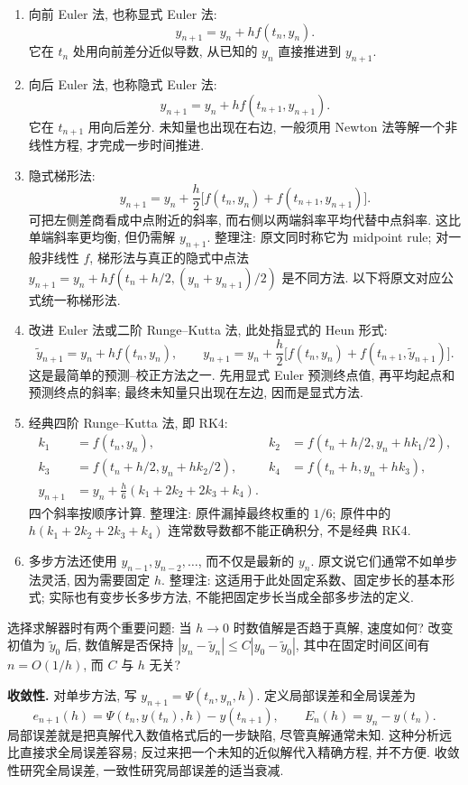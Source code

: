 \begin{enumerate}
\item 向前 Euler 法, 也称显式 Euler 法:
\[
y_{n+1}=y_n+hf(t_n,y_n).
\]
它在 $t_n$ 处用向前差分近似导数, 从已知的 $y_n$ 直接推进到 $y_{n+1}$.
\item 向后 Euler 法, 也称隐式 Euler 法:
\[
y_{n+1}=y_n+hf(t_{n+1},y_{n+1}).
\]
它在 $t_{n+1}$ 用向后差分. 未知量也出现在右边, 一般须用 Newton 法等解一个非线性方程, 才完成一步时间推进.
\item 隐式梯形法:
\[
y_{n+1}=y_n+\frac h2\bigl[f(t_n,y_n)+f(t_{n+1},y_{n+1})\bigr].
\]
可把左侧差商看成中点附近的斜率, 而右侧以两端斜率平均代替中点斜率. 这比单端斜率更均衡, 但仍需解 $y_{n+1}$. 整理注: 原文同时称它为 midpoint rule; 对一般非线性 $f$, 梯形法与真正的隐式中点法 $y_{n+1}=y_n+hf(t_n+h/2,(y_n+y_{n+1})/2)$ 是不同方法. 以下将原文对应公式统一称梯形法.
\item 改进 Euler 法或二阶 Runge--Kutta 法, 此处指显式的 Heun 形式:
\[
\widetilde y_{n+1}=y_n+hf(t_n,y_n),\qquad
y_{n+1}=y_n+\frac h2\bigl[f(t_n,y_n)+f(t_{n+1},\widetilde y_{n+1})\bigr].
\]
这是最简单的预测--校正方法之一. 先用显式 Euler 预测终点值, 再平均起点和预测终点的斜率; 最终未知量只出现在左边, 因而是显式方法.
\item 经典四阶 Runge--Kutta 法, 即 RK4:
\begin{align*}
k_1&=f(t_n,y_n),&k_2&=f(t_n+h/2,y_n+hk_1/2),\\
k_3&=f(t_n+h/2,y_n+hk_2/2),&k_4&=f(t_n+h,y_n+hk_3),\\
y_{n+1}&=y_n+\frac h6(k_1+2k_2+2k_3+k_4).
\end{align*}
四个斜率按顺序计算. 整理注: 原件漏掉最终权重的 $1/6$; 原件中的 $h(k_1+2k_2+2k_3+k_4)$ 连常数导数都不能正确积分, 不是经典 RK4.
\item 多步方法还使用 $y_{n-1},y_{n-2},\ldots$, 而不仅是最新的 $y_n$. 原文说它们通常不如单步法灵活, 因为需要固定 $h$. 整理注: 这适用于此处固定系数、固定步长的基本形式; 实际也有变步长多步方法, 不能把固定步长当成全部多步法的定义.
\end{enumerate}

选择求解器时有两个重要问题: 当 $h\to0$ 时数值解是否趋于真解, 速度如何? 改变初值为 $\widetilde y_0$ 后, 数值解是否保持 $|y_n-\widetilde y_n|\leq C|y_0-\widetilde y_0|$, 其中在固定时间区间有 $n=O(1/h)$, 而 $C$ 与 $h$ 无关?

\textbf{收敛性.} 对单步方法, 写 $y_{n+1}=\Psi(t_n,y_n,h)$. 定义局部误差和全局误差为
\[
e_{n+1}(h)=\Psi(t_n,y(t_n),h)-y(t_{n+1}),\qquad
E_n(h)=y_n-y(t_n).
\]
局部误差就是把真解代入数值格式后的一步缺陷, 尽管真解通常未知. 这种分析远比直接求全局误差容易; 反过来把一个未知的近似解代入精确方程, 并不方便. 收敛性研究全局误差, 一致性研究局部误差的适当衰减.

